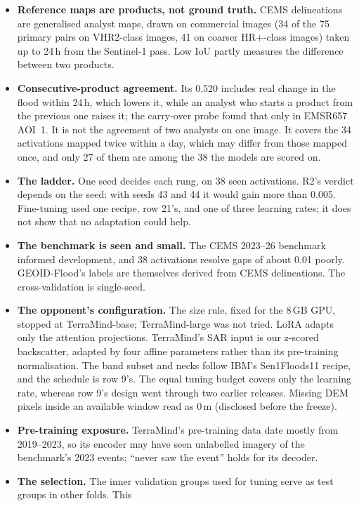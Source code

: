 \documentclass[10pt,twocolumn,a4paper]{article}
\begin{document}
\begin{itemize}
  \item \textbf{Reference maps are products, not ground truth.} CEMS delineations are generalised analyst maps, drawn
    on commercial images (34 of the 75 primary pairs on VHR2-class images, 41 on coarser HR+-class images) taken up
    to 24\,h from the Sentinel-1 pass. Low IoU partly measures the difference between two products.
  \item \textbf{Consecutive-product agreement.} Its 0.520 includes real change in the flood within 24\,h, which
    lowers it, while an analyst who starts a product from the previous one raises it; the carry-over probe found
    that only in EMSR657 AOI~1. It is not the agreement of two analysts on one image. It covers the 34 activations mapped twice within a day, which
    may differ from those mapped once, and only 27 of them are among the 38 the models are scored on.
  \item \textbf{The ladder.} One seed decides each rung, on 38 seen activations. R2's verdict depends on the seed: with
    seeds 43 and 44 it would gain more than 0.005. Fine-tuning used one recipe, row 21's, and one of three learning
    rates; it does not show that no adaptation could help.
  \item \textbf{The benchmark is seen and small.} The CEMS 2023--26 benchmark informed development, and 38
    activations resolve gaps of about 0.01 poorly. GEOID-Flood's labels are themselves derived from CEMS
    delineations. The cross-validation is single-seed.
  \item \textbf{The opponent's configuration.} The size rule, fixed for the 8\,GB GPU, stopped at TerraMind-base;
    TerraMind-large was not tried. LoRA adapts only the attention projections. TerraMind's SAR input is our z-scored
    backscatter, adapted by four affine parameters rather than its pre-training normalisation. The band subset and
    necks follow IBM's Sen1Floods11 recipe, and the schedule is row 9's. The equal tuning budget covers only the
    learning rate, whereas row 9's design went through two earlier releases. Missing DEM pixels inside an available
    window read as 0\,m (disclosed before the freeze).
  \item \textbf{Pre-training exposure.} TerraMind's pre-training data date mostly from 2019--2023, so its encoder may
    have seen unlabelled imagery of the benchmark's 2023 events; ``never saw the event'' holds for its decoder.
  \item \textbf{The selection.} The inner validation groups used for tuning serve as test groups in other folds. This

\end{itemize}
\end{document}
